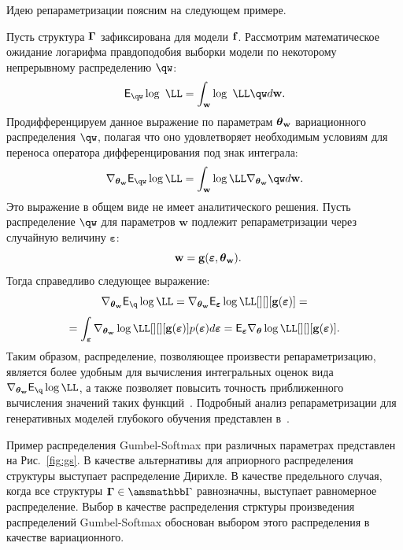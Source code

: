 Идею репараметризации поясним на следующем примере.
\begin{example} Пусть структура $\boldsymbol{\Gamma}$ зафиксирована для модели $\mathbf{f}$. Рассмотрим математическое ожидание логарифма правдоподобия выборки модели по некоторому непрерывному распределению $\qw$:
\[
    \E_{\qw} \log~\LL=  \int_{\w} \log~\LL \qw d\w.
\]
Продифференцируем данное выражение по параметрам $\boldsymbol{\theta}_\mathbf{w}$ вариационного распределения $\qw$, полагая что оно удовлетворяет необходимым условиям для переноса оператора дифференцирования под знак интеграла:
\[
    \nabla_{\tetaw} \E_{\qw} \log \LL = 
\int_{\w}  \log \LL \nabla_{\tetaw}\qw d\w.
\]
Это выражение в общем виде не имеет аналитического решения. Пусть распределение $\qw$ для параметров $\mathbf{w}$ подлежит репараметризации через случайную величину $\boldsymbol{\varepsilon}$:
\[
    \w = \mathbf{g}(\boldsymbol{\varepsilon}, \tetaw).
\] 
Тогда справедливо следующее выражение:
\[
 \nabla_{\tetaw} \E_{\q} \log \LL = \nabla_{\tetaw} \E_{\boldsymbol{\varepsilon}} \log \LL [][][\mathbf{g}(\boldsymbol{\varepsilon})] =
\]
\[= \int_{\boldsymbol{\varepsilon}}\nabla_{\tetaw} \log\LL [][][\mathbf{g}(\boldsymbol{\varepsilon})] p(\boldsymbol{\varepsilon}) d\boldsymbol{\varepsilon}=\E_{\boldsymbol{\varepsilon}} \nabla_{\teta} \log\LL [][][\mathbf{g}(\boldsymbol{\varepsilon})].\]
Таким образом, распределение, позволяющее произвести репараметризацию, является более удобным для вычисления интегральных оценок вида $ \nabla_{\tetaw} \E_{\q} \log \LL$, а также позволяет повысить точность приближенного вычисления значений таких функций~\cite{reparametrization}.
Подробный анализ репараметризации для генеративных моделей глубокого обучения представлен в~\cite{reparametrization_blog}.
\end{example}

Пример распределения Gumbel-Softmax при различных параметрах представлен на Рис.~\ref{fig:gs}. В качестве альтернативы для априорного распределения структуры выступает  распределение Дирихле. В качестве предельного случая, когда все структуры $\G \in \Gb$ равнозначны, выступает равномерное распределение. Выбор в качестве распределения стрктуры произведения распределений Gumbel-Softmax  обоснован выбором этого распределения в качестве вариационного. 

